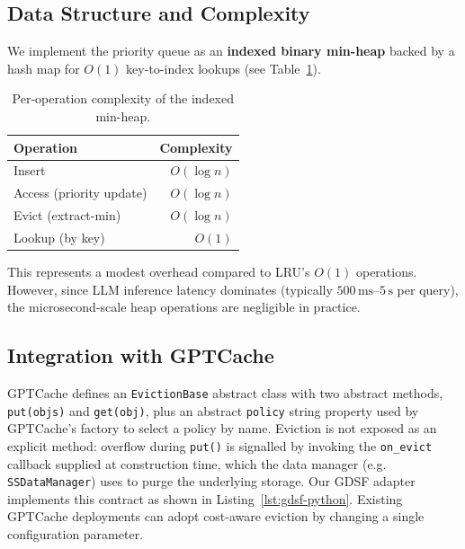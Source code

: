 \documentclass[sigconf, nonacm, review=false, screen=true]{acmart}
\begin{document}
\subsection{Data Structure and Complexity}
We implement the priority queue as an \textbf{indexed binary min-heap}
backed by a hash map for $O(1)$ key-to-index lookups (see
Table~\ref{tab:complexity}).

\begin{table}[t]
  \centering
  \caption{Per-operation complexity of the indexed min-heap.}
  \label{tab:complexity}
  \begin{tabular}{lr}
    \toprule
    Operation & Complexity \\
    \midrule
    Insert                    & $O(\log n)$ \\
    Access (priority update)  & $O(\log n)$ \\
    Evict (extract-min)       & $O(\log n)$ \\
    Lookup (by key)           & $O(1)$      \\
    \bottomrule
  \end{tabular}
\end{table}

This represents a modest overhead compared to LRU's $O(1)$ operations.
However, since LLM inference latency dominates (typically
$500\,\text{ms}$--$5\,\text{s}$ per query), the microsecond-scale heap
operations are negligible in practice.

\subsection{Integration with GPTCache}
GPTCache defines an \texttt{EvictionBase} abstract class with two
abstract methods, \texttt{put(objs)} and \texttt{get(obj)}, plus an
abstract \texttt{policy} string property used by GPTCache's factory to
select a policy by name. Eviction is not exposed as an explicit
method: overflow during \texttt{put()} is signalled by invoking the
\texttt{on\_evict} callback supplied at construction time, which the
data manager (e.g. \texttt{SSDataManager}) uses to purge the
underlying storage. Our GDSF adapter implements this contract as
shown in Listing~\ref{lst:gdsf-python}. Existing GPTCache deployments
can adopt cost-aware eviction by changing a single configuration
parameter.
\end{document}
